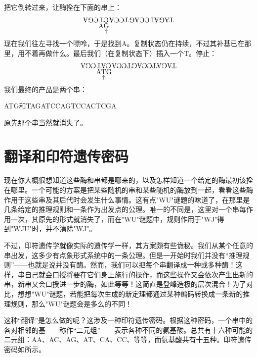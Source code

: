 把它倒转过来，让酶拴在下面的串上：
\[
\rotatebox[origin=c]{180}{CGA}
\begin{array}[t]{@{}c@{}}
\rotatebox[origin=c]{180}{CT}\\[-\dp\strutbox]
\mathrm{A}\underset{\uparrow}{\mathrm{G}}
\end{array}
\rotatebox[origin=c]{180}{TAGATCCAGTCCA}
\]
现在我们往左寻找一个嘌呤，于是找到A。复制状态仍在持续，不过其补基已在那里，用不着再做什么。最后我们（在复制状态下）插入一个T。停止：
\[
\rotatebox[origin=c]{180}{CGA}
\begin{array}[t]{@{}c@{}}
\rotatebox[origin=c]{180}{CAT}\\[-\dp\strutbox]
\mathrm{A}\underset{\uparrow}{\mathrm{T}}\mathrm{G}
\end{array}
\rotatebox[origin=c]{180}{TAGATCCAGTCCA}
\]
我们最终的产品是两个串：
\begin{center}
ATG和TAGATCCAGTCCACTCGA
\end{center}
原先那个串当然就消失了。

\section{翻译和印符遗传密码}

现在你大概很想知道这些酶和串都是哪来的，以及怎样知道一个给定的酶最初该拴在哪里。一个可能的方案是把某些随机的串和某些随机的酶放到一起，看看这些酶作用于这些串及其后代时会发生什么事情。这有点"WU"谜题的味道了，在那里是几条给定的推理规则和一条作为出发点的公理。唯一的不同是，这里对一个串每作用一次，其原先的形式就消失了，而在"WU"谜题中，规则作用于"WJ"得到"WJU"时，并不清除"WJ"。

不过，印符遗传学就像实际的遗传学一样，其方案颇有些诡秘。我们从某个任意的串出发，这多少有点象形式系统中的一条公理。但是一开始时我们并没有“推理规则”——也就是说并没有酶。然而，我们可以把每个串翻译成一种或多种酶！这样，串自己就会口授将要在它们身上施行的操作，而这些操作又会依次产生出新的串，新串又会口授进一步的酶，如此等等！这简直是登峰造极的层次混合！为了对比，想想"WU"谜题，若能把每次生成的新定理都通过某种编码转换成一条新的推理规则，那么"WU"谜题会是多么的不同！

这种“翻译”是怎么做的呢？这涉及一种印符遗传密码。根据这种密码，一个串中的各对相邻的基——称作“二元组”——表示各种不同的氨基酸。总共有十六种可能的二元组：AA、AC、AG、AT、CA、CC、等等，而氨基酸共有十五种。印符遗传密码如所示。

